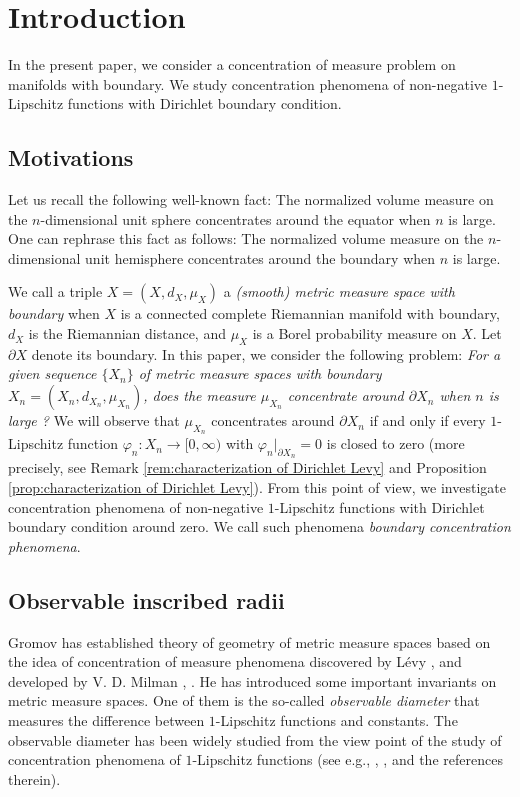 \section{Introduction}
In the present paper,
we consider a concentration of measure problem on manifolds with boundary.
We study concentration phenomena of non-negative $1$-Lipschitz functions with Dirichlet boundary condition.

\subsection{Motivations}
Let us recall the following well-known fact:
The normalized volume measure on the $n$-dimensional unit sphere concentrates around the equator when $n$ is large.
One can rephrase this fact as follows:
The normalized volume measure on the $n$-dimensional unit hemisphere concentrates around the boundary when $n$ is large.

We call a triple $X=(X,d_{X},\mu_{X})$ a \textit{(smooth) metric measure space with boundary}
when $X$ is a connected complete Riemannian manifold with boundary,
$d_{X}$ is the Riemannian distance,
and $\mu_{X}$ is a Borel probability measure on $X$.
Let $\partial X$ denote its boundary.
In this paper,
we consider the following problem:
\textit{For a given sequence $\{X_{n}\}$ of metric measure spaces with boundary $X_{n}=(X_{n},d_{X_{n}},\mu_{X_{n}})$,
does the measure $\mu_{X_{n}}$ concentrate around $\partial X_{n}$ when $n$ is large ?}
We will observe that
$\mu_{X_{n}}$ concentrates around $\partial X_{n}$ if and only if
every $1$-Lipschitz function $\varphi_{n}:X_{n}\to [0,\infty)$ with $\varphi_{n}|_{\partial X_{n}}=0$ is closed to zero (more precisely, see Remark \ref{rem:characterization of Dirichlet Levy} and Proposition \ref{prop:characterization of Dirichlet Levy}).
From this point of view,
we investigate concentration phenomena of non-negative $1$-Lipschitz functions with Dirichlet boundary condition around zero.
We call such phenomena \textit{boundary concentration phenomena}.

\subsection{Observable inscribed radii}
Gromov \cite{G} has established theory of geometry of metric measure spaces
based on the idea of concentration of measure phenomena discovered by L\'evy \cite{Le}, and developed by V. D. Milman \cite{M1}, \cite{M2}.
He has introduced some important invariants on metric measure spaces.
One of them is the so-called \textit{observable diameter}
that measures the difference between $1$-Lipschitz functions and constants.
The observable diameter has been widely studied from the view point of the study of concentration phenomena of $1$-Lipschitz functions (see e.g., \cite{G}, \cite{L2}, \cite{Sh} and the references therein).


